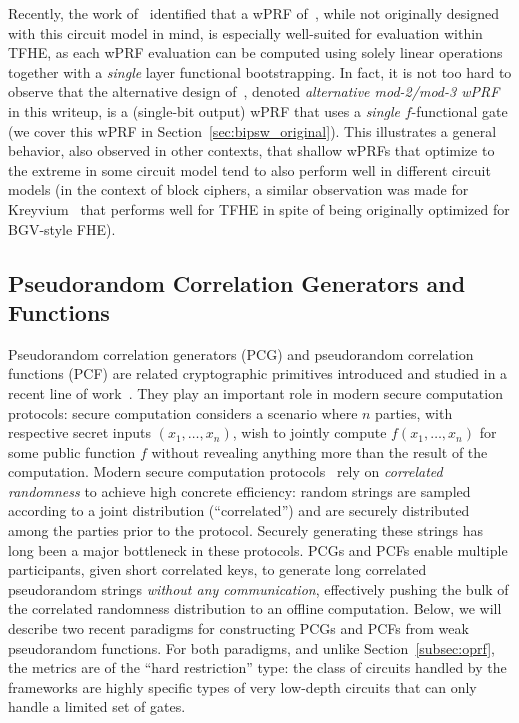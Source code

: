 \documentclass[journal=tosc,submission]{iacrtrans}
\theoremstyle{theorem}
\begin{document}
Recently, the work of~\cite{EC:ADDG24} identified that a wPRF of~\cite{TCC:BIPSW18}, while not originally designed with this circuit model in mind, is especially well-suited for evaluation within {\sf TFHE}, as each wPRF evaluation can be computed using solely linear operations together with a \emph{single} layer functional bootstrapping. In fact, it is not too hard to observe that the alternative design of~\cite{TCC:BIPSW18}, denoted \emph{alternative mod-2/mod-3 wPRF} in this writeup, is a (single-bit output) wPRF that uses a \emph{single} $f$-functional gate (we cover this wPRF in Section~\ref{sec:bipsw_original}). This illustrates a general behavior, also observed in other contexts, that shallow wPRFs that optimize to the extreme in some circuit model tend to also perform well in different circuit models (in the context of block ciphers, a similar observation was made for {\sf Kreyvium}~\cite{FSE:CCFLNP16} that performs well for {\sf TFHE} in spite of being originally optimized for BGV-style FHE).


\subsection{Pseudorandom Correlation Generators and Functions}

Pseudorandom correlation generators (PCG) and pseudorandom correlation functions (PCF) are related cryptographic primitives introduced and studied in a recent line of work~\cite{CCS:BCGI18,C:BCGIKS19,CCS:BCGIKR19,C:BCGIKS20,FOCS:BCGIKS20,C:CouRinRag21,C:BCGIKR22,C:BCCD23}. They play an important role in modern secure computation protocols: secure computation considers a scenario where $n$ parties, with respective secret inputs $(x_1, \ldots, x_n)$, wish to jointly compute $f(x_1,\ldots,x_n)$ for some public function $f$ without revealing anything more than the result of the computation. Modern secure computation protocols~\cite{STOC:GolMicWig87,AC:FKOS15,CCS:KelOrsSch16,C:DPSZ12,EC:KelPasRot18} rely on \emph{correlated randomness} to achieve high concrete efficiency: random strings are sampled according to a joint distribution (``correlated'') and are securely distributed among the parties prior to the protocol. Securely generating these strings has long been a major bottleneck in these protocols. PCGs and PCFs enable multiple participants, given short correlated keys, to generate long correlated pseudorandom strings \emph{without any communication}, effectively pushing the bulk of the correlated randomness distribution to an offline computation. Below, we will describe two recent paradigms for constructing PCGs and PCFs from weak pseudorandom functions. For both paradigms, and unlike Section~\ref{subsec:oprf}, the metrics are of the ``hard restriction'' type: the class of circuits handled by the frameworks are highly specific types of very low-depth circuits that can only handle a limited set of gates.
\end{document}
